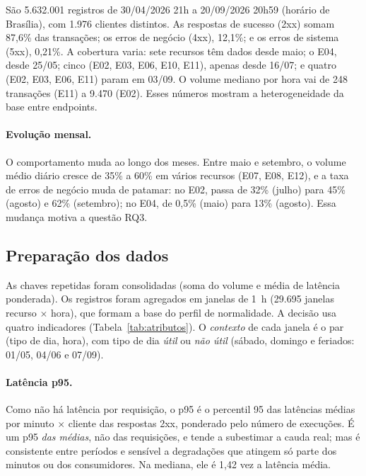 \documentclass[sigconf,nonacm]{acmart}
\begin{document}
São 5.632.001 registros de 30/04/2026 21h a 20/09/2026 20h59 (horário de Brasília), com 1.976 clientes distintos. As respostas de sucesso (2xx) somam 87,6\% das transações; os erros de negócio (4xx), 12,1\%; e os erros de sistema (5xx), 0,21\%. A cobertura varia: sete recursos têm dados desde maio; o E04, desde 25/05; cinco (E02, E03, E06, E10, E11), apenas desde 16/07; e quatro (E02, E03, E06, E11) param em 03/09. O volume mediano por hora vai de 248 transações (E11) a 9.470 (E02). Esses números mostram a heterogeneidade da base entre endpoints.

\paragraph{Evolução mensal.} O comportamento muda ao longo dos meses. Entre maio e setembro, o volume médio diário cresce de 35\% a 60\% em vários recursos (E07, E08, E12), e a taxa de erros de negócio muda de patamar: no E02, passa de 32\% (julho) para 45\% (agosto) e 62\% (setembro); no E04, de 0,5\% (maio) para 13\% (agosto). Essa mudança motiva a questão RQ3.

\subsection{Preparação dos dados}
As chaves repetidas foram consolidadas (soma do volume e média de latência ponderada). Os registros foram agregados em janelas de 1~h (29.695 janelas recurso $\times$ hora), que formam a base do perfil de normalidade. A decisão usa quatro indicadores (Tabela~\ref{tab:atributos}). O \emph{contexto} de cada janela é o par (tipo de dia, hora), com tipo de dia \emph{útil} ou \emph{não útil} (sábado, domingo e feriados: 01/05, 04/06 e 07/09).

\paragraph{Latência p95.} Como não há latência por requisição, o p95 é o percentil 95 das latências médias por minuto $\times$ cliente das respostas 2xx, ponderado pelo número de execuções. É um p95 \emph{das médias}, não das requisições, e tende a subestimar a cauda real; mas é consistente entre períodos e sensível a degradações que atingem só parte dos minutos ou dos consumidores. Na mediana, ele é 1,42 vez a latência média.
\end{document}
